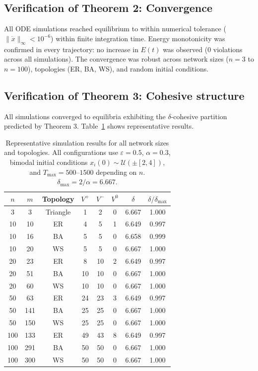 \documentclass[3p]{elsarticle}
\begin{document}
\subsection{Verification of Theorem 2: Convergence}

All ODE simulations reached equilibrium to within numerical tolerance ($\|\dot x\|_\infty < 10^{-6}$) within finite integration time. Energy monotonicity was confirmed in every trajectory: no increase in $E(t)$ was observed (0 violations across all simulations). The convergence was robust across network sizes ($n=3$ to $n=100$), topologies (ER, BA, WS), and random initial conditions.

\subsection{Verification of Theorem 3: Cohesive structure}

All simulations converged to equilibria exhibiting the $\delta$-cohesive partition predicted by Theorem 3. Table~\ref{tab:simulation} shows representative results.

\begin{table}[ht]
\centering
\caption{Representative simulation results for all network sizes and topologies. All configurations use $\varepsilon=0.5$, $\alpha=0.3$, bimodal initial conditions $x_i(0)\sim\mathcal{U}(\pm[2,4])$, and $T_{\max}=500$--$1500$ depending on $n$. $\delta_{\max}=2/\alpha=6.667$.}
\label{tab:simulation}
\begin{tabular}{cccccccc}
\toprule
$n$ & $m$ & Topology & $V^+$ & $V^-$ & $V^0$ & $\delta$ & $\delta/\delta_{\max}$\\
\midrule
3  & 3  & Triangle & 1 & 2 & 0 & 6.667 & 1.000 \\
10 & 10 & ER & 4 & 5 & 1 & 6.649 & 0.997 \\
10 & 16 & BA & 5 & 5 & 0 & 6.658 & 0.999 \\
10 & 20 & WS & 5 & 5 & 0 & 6.667 & 1.000 \\
20 & 23 & ER & 8 & 10 & 2 & 6.649 & 0.997 \\
20 & 51 & BA & 10 & 10 & 0 & 6.667 & 1.000 \\
20 & 60 & WS & 10 & 10 & 0 & 6.667 & 1.000 \\
50 & 63 & ER & 24 & 23 & 3 & 6.649 & 0.997 \\
50 & 141 & BA & 25 & 25 & 0 & 6.667 & 1.000 \\
50 & 150 & WS & 25 & 25 & 0 & 6.667 & 1.000 \\
100 & 133 & ER & 49 & 43 & 8 & 6.649 & 0.997 \\
100 & 291 & BA & 50 & 50 & 0 & 6.667 & 1.000 \\
100 & 300 & WS & 50 & 50 & 0 & 6.667 & 1.000 \\
\bottomrule
\end{tabular}
\end{table}
\end{document}
